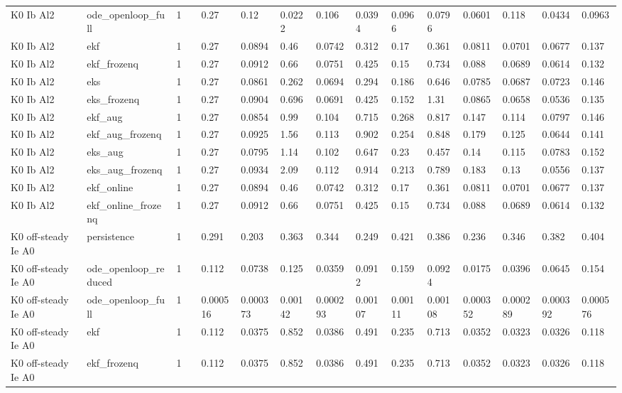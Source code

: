 \begin{table}[t]
\begin{tabular}{lllllllllllllll}
K0 Ib Al2 & ode\_openloop\_full & 1 &  & 0.27 & 0.12 & 0.0222 & 0.106 & 0.0394 & 0.0966 & 0.0796 & 0.0601 & 0.118 & 0.0434 & 0.0963 \\
K0 Ib Al2 & ekf & 1 &  & 0.27 & 0.0894 & 0.46 & 0.0742 & 0.312 & 0.17 & 0.361 & 0.0811 & 0.0701 & 0.0677 & 0.137 \\
K0 Ib Al2 & ekf\_frozenq & 1 &  & 0.27 & 0.0912 & 0.66 & 0.0751 & 0.425 & 0.15 & 0.734 & 0.088 & 0.0689 & 0.0614 & 0.132 \\
K0 Ib Al2 & eks & 1 &  & 0.27 & 0.0861 & 0.262 & 0.0694 & 0.294 & 0.186 & 0.646 & 0.0785 & 0.0687 & 0.0723 & 0.146 \\
K0 Ib Al2 & eks\_frozenq & 1 &  & 0.27 & 0.0904 & 0.696 & 0.0691 & 0.425 & 0.152 & 1.31 & 0.0865 & 0.0658 & 0.0536 & 0.135 \\
K0 Ib Al2 & ekf\_aug & 1 &  & 0.27 & 0.0854 & 0.99 & 0.104 & 0.715 & 0.268 & 0.817 & 0.147 & 0.114 & 0.0797 & 0.146 \\
K0 Ib Al2 & ekf\_aug\_frozenq & 1 &  & 0.27 & 0.0925 & 1.56 & 0.113 & 0.902 & 0.254 & 0.848 & 0.179 & 0.125 & 0.0644 & 0.141 \\
K0 Ib Al2 & eks\_aug & 1 &  & 0.27 & 0.0795 & 1.14 & 0.102 & 0.647 & 0.23 & 0.457 & 0.14 & 0.115 & 0.0783 & 0.152 \\
K0 Ib Al2 & eks\_aug\_frozenq & 1 &  & 0.27 & 0.0934 & 2.09 & 0.112 & 0.914 & 0.213 & 0.789 & 0.183 & 0.13 & 0.0556 & 0.137 \\
K0 Ib Al2 & ekf\_online & 1 &  & 0.27 & 0.0894 & 0.46 & 0.0742 & 0.312 & 0.17 & 0.361 & 0.0811 & 0.0701 & 0.0677 & 0.137 \\
K0 Ib Al2 & ekf\_online\_frozenq & 1 &  & 0.27 & 0.0912 & 0.66 & 0.0751 & 0.425 & 0.15 & 0.734 & 0.088 & 0.0689 & 0.0614 & 0.132 \\
K0 off-steady Ie A0 & persistence & 1 &  & 0.291 & 0.203 & 0.363 & 0.344 & 0.249 & 0.421 & 0.386 & 0.236 & 0.346 & 0.382 & 0.404 \\
K0 off-steady Ie A0 & ode\_openloop\_reduced & 1 &  & 0.112 & 0.0738 & 0.125 & 0.0359 & 0.0912 & 0.159 & 0.0924 & 0.0175 & 0.0396 & 0.0645 & 0.154 \\
K0 off-steady Ie A0 & ode\_openloop\_full & 1 &  & 0.000516 & 0.000373 & 0.00142 & 0.000293 & 0.00107 & 0.00111 & 0.00108 & 0.000352 & 0.000289 & 0.000392 & 0.000576 \\
K0 off-steady Ie A0 & ekf & 1 &  & 0.112 & 0.0375 & 0.852 & 0.0386 & 0.491 & 0.235 & 0.713 & 0.0352 & 0.0323 & 0.0326 & 0.118 \\
K0 off-steady Ie A0 & ekf\_frozenq & 1 &  & 0.112 & 0.0375 & 0.852 & 0.0386 & 0.491 & 0.235 & 0.713 & 0.0352 & 0.0323 & 0.0326 & 0.118 \\

\end{tabular}
\end{table}

